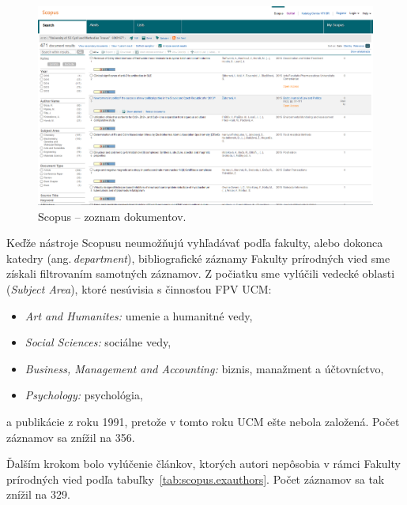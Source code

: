 \begin{figure}
  \centering
  \includegraphics[width=\textwidth]{obr/scopus04-cut.jpg}
  \caption{Scopus -- zoznam dokumentov.}
  \label{fig:scopus.documentlist}
\end{figure}

Keďže nástroje Scopusu neumožňujú vyhľadávať podľa fakulty, alebo dokonca
katedry (ang.\,\emph{department}), bibliografické záznamy Fakulty prírodných
vied sme získali filtrovaním samotných záznamov.  Z počiatku sme vylúčili
vedecké oblasti (\emph{Subject Area}), ktoré nesúvisia s činnosťou FPV UCM:
\begin{itemize}

\item \emph{Art and Humanites:} umenie a humanitné vedy,

\item \emph{Social Sciences:} sociálne vedy,

\item \emph{Business, Management and Accounting:} biznis, manažment a
  účtovníctvo,

\item \emph{Psychology:} psychológia,

\end{itemize}
a publikácie z roku 1991, pretože v tomto roku UCM ešte nebola založená.  Počet
záznamov sa znížil na 356.

Ďalším krokom bolo vylúčenie článkov, ktorých autori nepôsobia v rámci Fakulty
prírodných vied podľa tabuľky~\ref{tab:scopus.exauthors}.  Počet záznamov sa tak
znížil na 329.

